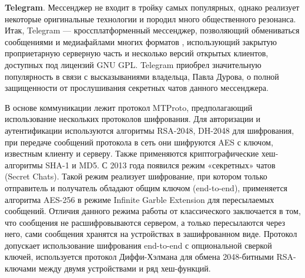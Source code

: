 \textbf{Telegram}. Мессенджер не входит в тройку самых популярных, однако реализует некоторые оригинальные технологии и породил много общественного резонанса. Итак, Telegram — кроссплатформенный мессенджер, позволяющий обмениваться сообщениями и медиафайлами многих форматов %
, использующий закрытую проприетарную  серверную часть и несколько версий открытых клиентов, доступных под лицензий GNU GPL. Telegram приобрел значительную популярность в связи с высказываниями владельца, Павла Дурова, о полной защищенности от прослушивания секретных  чатов данного мессенджера. %

В основе коммуникации лежит протокол MTProto, предполагающий использование нескольких протоколов шифрования. 	 Для авторизации и аутентификации используются алгоритмы RSA-2048, DH-2048 для шифрования, при передаче сообщений протокола в сеть они шифруются AES с ключом, известным клиенту и серверу. Также применяются криптографические хеш-алгоритмы SHA-1 и MD5.  С 2013 года появился режим «секретных» чатов (Secret Chats).	Такой режим реализует шифрование, при котором только  отправитель и получатель обладают общим ключом (end-to-end), применяется  алгоритма AES-256 в режиме  Infinite Garble Extension для пересылаемых сообщений. Отличия данного режима работы от классического заключается в том, что сообщения не расшифровываются сервером, а только пересылаются через него, сами сообщения хранятся на устройствах в зашифрованном виде. Протокол допускает использование шифрования end-to-end с опциональной сверкой ключей, используется  протокол Диффи-Хэлмана для обмена 2048-битными RSA-ключами между двумя устройствами и ряд хеш-функций.


